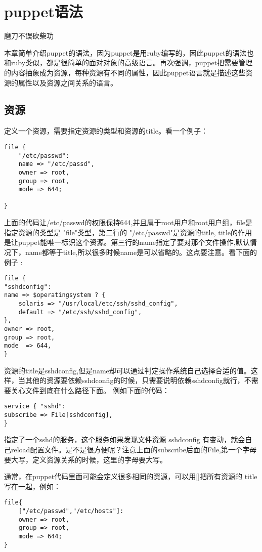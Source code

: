 \chapter{\msyh puppet语法}
\begin{center}
\kai
磨刀不误砍柴功\par
\end{center}
\song
\par
本章简单介绍puppet的语法，因为puppet是用ruby编写的，因此puppet的语法也和ruby类似，都是很简单的面对对象的高级语言。再次强调，puppet把需要管理的内容抽象成为资源，每种资源有不同的属性，因此puppet语言就是描述这些资源的属性以及资源之间关系的语言。\par
\section{\msyh 资源}
定义一个资源，需要指定资源的类型和资源的title。看一个例子：
\msyh \begin{lstlisting}
file {
	"/etc/passwd":
	name => "/etc/passd",
	owner => root,
	group => root,
	mode => 644;
	
}
\end{lstlisting} \song
上面的代码让/etc/passwd的权限保持644,并且属于root用户和root用户组，file是指定资源的类型是 "file"类型，第二行的 "/etc/passwd"是资源的title, title的作用是让puppet能唯一标识这个资源。第三行的name指定了要对那个文件操作,默认情况下，name都等于title,所以很多时候name是可以省略的。这点要注意。看下面的例子 :
\msyh \begin{lstlisting}
file { 
"sshdconfig":
name => $operatingsystem ? {
	solaris => "/usr/local/etc/ssh/sshd_config",
	default => "/etc/ssh/sshd_config",
},
owner => root,
group => root,
mode  => 644,
}
\end{lstlisting} \song

资源的title是sshdconfig,但是name却可以通过判定操作系统自己选择合适的值。这样，当其他的资源要依赖sshdconfig的时候，只需要说明依赖sshdconfig就行，不需要关心文件到底在什么路径下面。
例如下面的代码：
\msyh \begin{lstlisting}
service { "sshd":
subscribe => File[sshdconfig],
}
\end{lstlisting} \song
指定了一个sshd的服务，这个服务如果发现文件资源 sshdconfig 有变动，就会自己reload配置文件。是不是很方便呢？注意上面的subscribe后面的File,第一个字母要大写，定义资源关系的时候，这里的字母要大写。
\par

通常，在puppet代码里面可能会定义很多相同的资源，可以用[]把所有资源的 title写在一起，例如：
\msyh \begin{lstlisting}
file{
	["/etc/passwd","/etc/hosts"]:
	owner => root,
	group => root,
	mode => 644;
}
\end{lstlisting} \song


